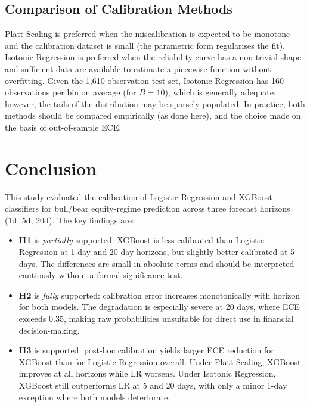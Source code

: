 \documentclass[12pt]{article}
\begin{document}
\subsection{Comparison of Calibration Methods}

Platt Scaling is preferred when the miscalibration is expected to be monotone
and the calibration dataset is small (the parametric form regularises the fit).
Isotonic Regression is preferred when the reliability curve has a non-trivial
shape and sufficient data are available to estimate a piecewise function without
overfitting.
Given the 1,610-observation test set, Isotonic Regression has 160 observations
per bin on average (for $B=10$), which is generally adequate; however, the tails
of the distribution may be sparsely populated.
In practice, both methods should be compared empirically (as done here), and the
choice made on the basis of out-of-sample ECE.

\section{Conclusion}

This study evaluated the calibration of Logistic Regression and XGBoost classifiers
for bull/bear equity-regime prediction across three forecast horizons (1d, 5d, 20d).
The key findings are:

\begin{itemize}[leftmargin=1.5em,itemsep=2pt,topsep=4pt]
  \item \textbf{H1} is \emph{partially} supported: XGBoost is less calibrated than
    Logistic Regression at 1-day and 20-day horizons, but slightly better calibrated
    at 5 days.
    The differences are small in absolute terms and should be interpreted cautiously
    without a formal significance test.
  \item \textbf{H2} is \emph{fully} supported: calibration error increases
    monotonically with horizon for both models.
    The degradation is especially severe at 20 days, where ECE exceeds 0.35,
    making raw probabilities unsuitable for direct use in financial decision-making.
  \item \textbf{H3} is supported: post-hoc calibration yields larger ECE reduction
    for XGBoost than for Logistic Regression overall.
    Under Platt Scaling, XGBoost improves at all horizons while LR worsens.
    Under Isotonic Regression, XGBoost still outperforms LR at 5 and 20 days,
    with only a minor 1-day exception where both models deteriorate.
\end{itemize}
\end{document}
